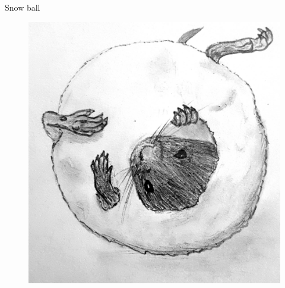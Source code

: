 \documentclass[10pt]{beamer}%
\begin{document}
\begin{frame}{Snow ball}
	\begin{figure}
	\centering
		\includegraphics[height= \textheight]{Figures/SnowBall}
	\end{figure}
\end{frame}
\end{document}

